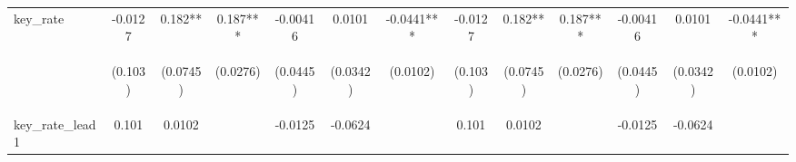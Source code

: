 \documentclass[]{article}
\begin{document}
\begin{center}
\begin{tabular}{lcccccccccccc}
key\_rate & -0.0127 & 0.182** & 0.187*** & -0.00416 & 0.0101 & -0.0441*** & -0.0127 & 0.182** & 0.187*** & -0.00416 & 0.0101 & -0.0441*** \\
\vspace{4pt} & \begin{footnotesize}(0.103)\end{footnotesize} & \begin{footnotesize}(0.0745)\end{footnotesize} & \begin{footnotesize}(0.0276)\end{footnotesize} & \begin{footnotesize}(0.0445)\end{footnotesize} & \begin{footnotesize}(0.0342)\end{footnotesize} & \begin{footnotesize}(0.0102)\end{footnotesize} & \begin{footnotesize}(0.103)\end{footnotesize} & \begin{footnotesize}(0.0745)\end{footnotesize} & \begin{footnotesize}(0.0276)\end{footnotesize} & \begin{footnotesize}(0.0445)\end{footnotesize} & \begin{footnotesize}(0.0342)\end{footnotesize} & \begin{footnotesize}(0.0102)\end{footnotesize} \\
key\_rate\_lead1 & 0.101 & 0.0102 &  & -0.0125 & -0.0624 &  & 0.101 & 0.0102 &  & -0.0125 & -0.0624 &  \\

\end{tabular}
\end{center}
\end{document}
